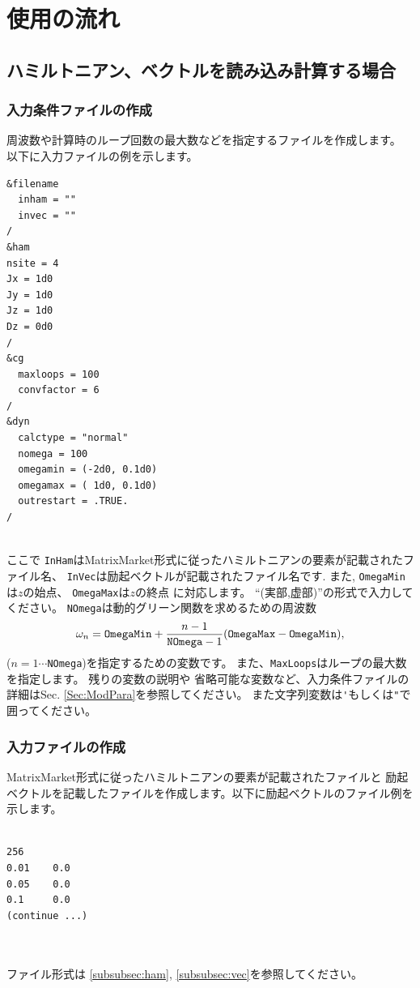 \documentclass[12pt,titlepage]{jarticle}
\begin{document}
\newpage
\section{使用の流れ}\label{Sec:Usage}
\subsection{ハミルトニアン、ベクトルを読み込み計算する場合}
\subsubsection*{入力条件ファイルの作成}
周波数や計算時のループ回数の最大数などを指定するファイルを作成します。
以下に入力ファイルの例を示します。\\
\begin{minipage}{10cm}
\begin{screen}
\begin{verbatim}
&filename
  inham = ""
  invec = ""
/
&ham
nsite = 4
Jx = 1d0
Jy = 1d0
Jz = 1d0
Dz = 0d0
/
&cg
  maxloops = 100
  convfactor = 6
/
&dyn
  calctype = "normal"
  nomega = 100
  omegamin = (-2d0, 0.1d0)
  omegamax = ( 1d0, 0.1d0)
  outrestart = .TRUE.
/
\end{verbatim}
\end{screen}
\end{minipage}
\\
ここで
\verb|InHam|はMatrixMarket形式に従ったハミルトニアンの要素が記載されたファイル名、
\verb|InVec|は励起ベクトルが記載されたファイル名です.
また,
\verb|OmegaMin|は$z$の始点、
\verb|OmegaMax|は$z$の終点
に対応します。
``(実部,虚部)''の形式で入力してください。
\verb|NOmega|は動的グリーン関数を求めるための周波数
\begin{align}
  \omega_n =  {\tt OmegaMin} + \frac{n-1}{{\tt NOmega}-1}({\tt OmegaMax} - {\tt OmegaMin}),
\end{align}
($n=1\cdots$\verb|NOmega|)を指定するための変数です。
また、\verb|MaxLoops|はループの最大数を指定します。
残りの変数の説明や
省略可能な変数など、入力条件ファイルの詳細はSec. \ref{Sec:ModPara}を参照してください。
また文字列変数は\verb|'|もしくは\verb|"|で囲ってください。

\subsubsection*{入力ファイルの作成}
MatrixMarket形式に従ったハミルトニアンの要素が記載されたファイルと
励起ベクトルを記載したファイルを作成します。以下に励起ベクトルのファイル例を示します。\\
\\
\begin{minipage}{10cm}
\begin{screen}
\begin{verbatim}
256
0.01    0.0
0.05    0.0
0.1     0.0
(continue ...)
\end{verbatim}
\end{screen}
\end{minipage}
\\\\
ファイル形式は \ref{subsubsec:ham},  \ref{subsubsec:vec}を参照してください。\\
\end{document}
